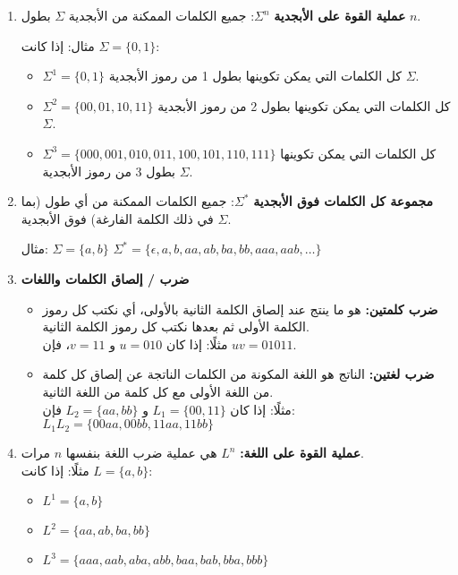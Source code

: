 \documentclass[12pt]{article}
\begin{document}
\begin{enumerate}

\item
    \textbf{عملية القوة على الأبجدية} $\Sigma^n$: جميع الكلمات الممكنة من الأبجدية $\Sigma$ بطول $n$.

    مثال: إذا كانت $\Sigma = \{0,1\}$:
    \begin{itemize}
        \item $\Sigma^1 = \{0, 1\}$ كل الكلمات التي يمكن تكوينها بطول 1 من رموز الأبجدية $\Sigma$.
        \item $\Sigma^2 = \{00, 01, 10, 11\}$ كل الكلمات التي يمكن تكوينها بطول 2 من رموز الأبجدية $\Sigma$.
        \item $\Sigma^3 = \{000, 001, 010, 011, 100, 101, 110, 111\}$ كل الكلمات التي يمكن تكوينها بطول 3 من رموز الأبجدية $\Sigma$.
    \end{itemize}

\item
    \textbf{مجموعة كل الكلمات فوق الأبجدية} $\Sigma^*$: جميع الكلمات الممكنة من أي طول (بما في ذلك الكلمة الفارغة) فوق الأبجدية $\Sigma$.

    مثال: $\Sigma = \{a, b\}$
    $\Sigma^* = \{\epsilon, a, b, aa, ab, ba, bb, aaa, aab, \dots\}$

\item
    \textbf{ضرب / إلصاق الكلمات واللغات}
    \begin{itemize}
        \item \textbf{ضرب كلمتين:} هو ما ينتج عند إلصاق الكلمة الثانية بالأولى، أي نكتب كل رموز الكلمة الأولى ثم بعدها نكتب كل رموز الكلمة الثانية. \\
        مثلًا: إذا كان $u = 010$ و $v = 11$، فإن $uv = 01011$.
        \item \textbf{ضرب لغتين:} الناتج هو اللغة المكونة من الكلمات الناتجة عن إلصاق كل كلمة من اللغة الأولى مع كل كلمة من اللغة الثانية. \\
        مثلًا: إذا كان $L_1 = \{00,11\}$ و $L_2 = \{aa,bb\}$ فإن: $L_1L_2 = \{00aa, 00bb, 11aa, 11bb\}$
    \end{itemize}

\item
    \textbf{عملية القوة على اللغة:} $L^n$ هي عملية ضرب اللغة بنفسها $n$ مرات. \\
    مثلًا: إذا كانت $L = \{a,b\}$:
    \begin{itemize}
        \item $L^1 = \{a,b\}$
        \item $L^2 = \{aa, ab, ba, bb\}$
        \item $L^3 = \{aaa, aab, aba, abb, baa, bab, bba, bbb\}$
    \end{itemize}

\end{enumerate}
\end{document}

